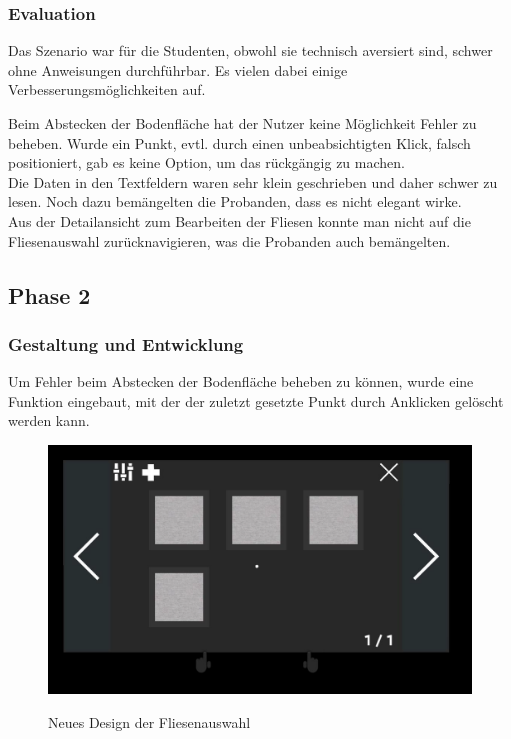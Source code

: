 \subsubsection{Evaluation}

Das Szenario war für die Studenten, obwohl sie technisch aversiert sind, schwer ohne Anweisungen durchführbar. Es vielen dabei einige Verbesserungsmöglichkeiten auf. 

Beim Abstecken der Bodenfläche hat der Nutzer keine Möglichkeit Fehler zu beheben. Wurde ein Punkt, evtl. durch einen unbeabsichtigten Klick, falsch positioniert, gab es keine Option, um das rückgängig zu machen. \\
Die Daten in den Textfeldern waren sehr klein geschrieben und daher schwer zu lesen. Noch dazu bemängelten die Probanden, dass es nicht elegant wirke. \\
Aus der Detailansicht zum Bearbeiten der Fliesen konnte man nicht auf die Fliesenauswahl zurücknavigieren, was die Probanden auch bemängelten.

\subsection{Phase 2}

\subsubsection{Gestaltung und Entwicklung}

Um Fehler beim Abstecken der Bodenfläche beheben zu können, wurde eine Funktion eingebaut, mit der der zuletzt gesetzte Punkt durch Anklicken gelöscht werden kann. 

\begin{figure}[h]
	\begin{center}
		\noindent\includegraphics[scale=0.4]{Resources/Artefakt/auswahl.png}
		\label{auswahl}
		\caption{Neues Design der Fliesenauswahl}	
	\end{center}
\end{figure}


